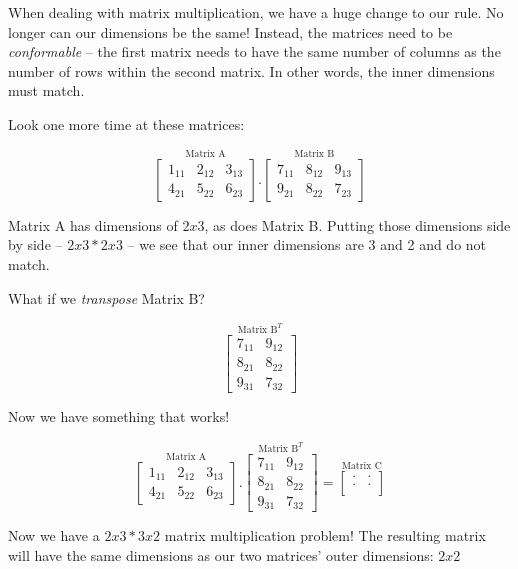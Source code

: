 \documentclass[
  letterpaper,
]{krantz}
\begin{document}
When dealing with matrix multiplication, we have a huge change to our
rule. No longer can our dimensions be the same! Instead, the matrices
need to be \emph{conformable} -- the first matrix needs to have the same
number of columns as the number of rows within the second matrix. In
other words, the inner dimensions must match.

Look one more time at these matrices:

\[
\stackrel{\mbox{Matrix A}}{
\begin{bmatrix}
1_{11} & 2_{12} & 3_{13}\\
4_{21} & 5_{22} & 6_{23}
\end{bmatrix}
}
.
\stackrel{\mbox{Matrix B}}{
\begin{bmatrix}
7_{11} & 8_{12} & 9_{13}\\
9_{21} & 8_{22} & 7_{23}
\end{bmatrix} 
}
\]

Matrix A has dimensions of \(2x3\), as does Matrix B. Putting those
dimensions side by side -- \(2x3 * 2x3\) -- we see that our inner
dimensions are 3 and 2 and do not match.

What if we \emph{transpose} Matrix B?

\[
\stackrel{\mbox{Matrix B}^T}{
\begin{bmatrix}
7_{11} & 9_{12} \\ 
8_{21}& 8_{22}\\
9_{31} & 7_{32}
\end{bmatrix} 
}
\]

Now we have something that works!

\[
\stackrel{\mbox{Matrix A}}{
\begin{bmatrix}
1_{11} & 2_{12} & 3_{13}\\
4_{21} & 5_{22} & 6_{23}
\end{bmatrix}
}
.
\stackrel{\mbox{Matrix B}^T}{
\begin{bmatrix}
7_{11} & 9_{12} \\ 
8_{21}& 8_{22}\\
9_{31} & 7_{32}
\end{bmatrix} 
}
=
\stackrel{\mbox{Matrix C}}{
\begin{bmatrix}
. & . \\
. & . \\
\end{bmatrix}
}
\]

Now we have a \(2x3 * 3x2\) matrix multiplication problem! The resulting
matrix will have the same dimensions as our two matrices' outer
dimensions: \(2x2\)
\end{document}
